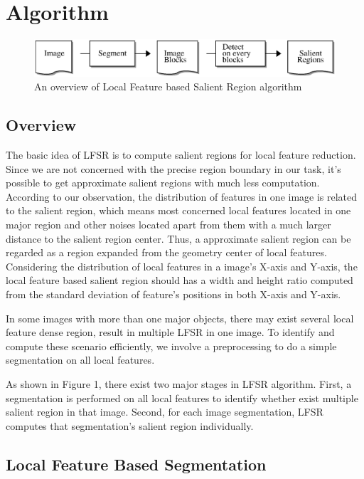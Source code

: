 \section{Algorithm}

\begin{figure}[!t] 
\centering
\label{fig:overview}
\includegraphics[width=120mm]{fig-overview.eps}
\caption{An overview of Local Feature based Salient Region algorithm}
\end{figure}

\subsection{Overview}

The basic idea of LFSR is to compute salient regions for local feature reduction. Since we are not concerned with the precise region boundary in our task, it's possible to get approximate salient regions with much less computation. According to our observation, the distribution of features in one image is related to the salient region, which means most concerned local features located in one major region and other noises located apart from them with a much larger distance to the salient region center. Thus, a approximate salient region can be regarded as a region expanded from the geometry center of local features. Considering the distribution of local features in a image's X-axis and Y-axis, the local feature based salient region should has a width and height ratio computed from the standard deviation of feature's positions in both X-axis and Y-axis.

In some images with more than one major objects, there may exist several local feature dense region, result in multiple LFSR in one image. To identify and compute these scenario efficiently, we involve a preprocessing to do a simple segmentation on all local features. 

As shown in Figure 1, there exist two major stages in LFSR algorithm. First, a segmentation is performed on all local features to identify whether exist multiple salient region in that image. Second, for each image segmentation, LFSR computes that segmentation's salient region individually.

\subsection{Local Feature Based Segmentation}

